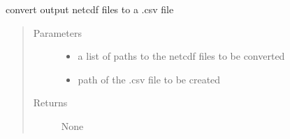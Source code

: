 \documentclass[letterpaper,10pt,english]{sphinxmanual}
\begin{document}

\begin{fulllineitems}
\label{\detokenize{octapy:octapy.tools.netcdf_to_csv}}
\sphinxAtStartPar
convert output netcdf files to a .csv file
\begin{quote}\begin{description}
\item[{Parameters}] \leavevmode\begin{itemize}
\item {} 
\sphinxAtStartPar
{} \textendash{} a list of paths to the netcdf files to be converted

\item {} 
\sphinxAtStartPar
{} \textendash{} path of the .csv file to be created

\end{itemize}

\item[{Returns}] \leavevmode
\sphinxAtStartPar
None

\end{description}\end{quote}

\end{fulllineitems}

\end{document}
